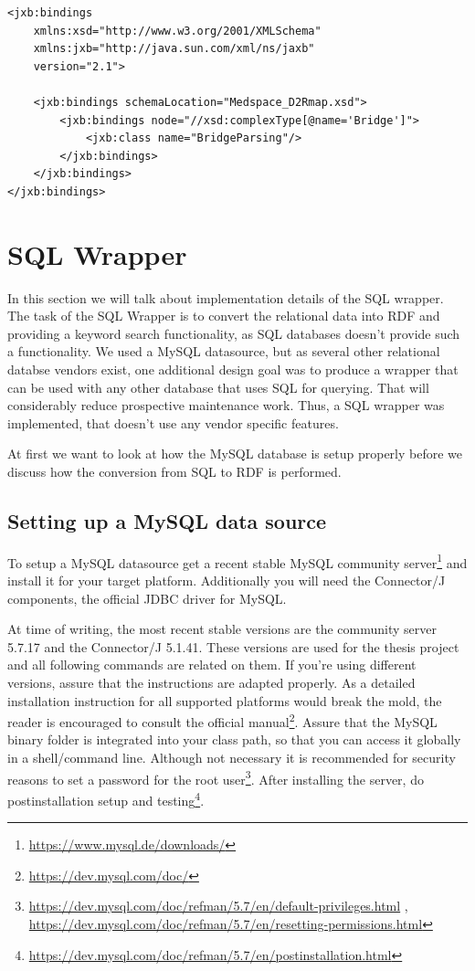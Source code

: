 \begin{lstlisting}[style=RdfCodeStyle, caption=JAXB binding example, label=jaxbExample]
<jxb:bindings 
    xmlns:xsd="http://www.w3.org/2001/XMLSchema"
    xmlns:jxb="http://java.sun.com/xml/ns/jaxb"
    version="2.1">

    <jxb:bindings schemaLocation="Medspace_D2Rmap.xsd">
		<jxb:bindings node="//xsd:complexType[@name='Bridge']">
			<jxb:class name="BridgeParsing"/>
		</jxb:bindings>
    </jxb:bindings>
</jxb:bindings>
\end{lstlisting}



\section{SQL Wrapper}

In this section we will talk about implementation details of the SQL wrapper. 
The task of the SQL Wrapper is to convert the relational data into RDF and providing a keyword search functionality, as SQL databases doesn't provide such a functionality.
We used a MySQL datasource, but as several other relational databse vendors exist, one additional design goal was to produce a wrapper that can be used with any other database that uses SQL for querying. That will considerably reduce prospective maintenance work.
Thus, a SQL wrapper was implemented, that doesn't use any vendor specific features.

At first we want to look at how the MySQL database is setup properly before we discuss how the conversion from SQL to RDF is performed.



\subsection{Setting up a MySQL data source}

To setup a MySQL datasource get a recent stable MySQL community server\footnote{\url{https://www.mysql.de/downloads/}} 
and install it for your target platform. Additionally you will need the Connector/J components, the official JDBC driver for MySQL. 

At time of writing, the most recent stable versions are the community server 5.7.17 and the Connector/J 5.1.41. These versions are used for the thesis project and all following commands are related on them. If you're using 
different versions, assure that the instructions are adapted properly. As a detailed installation instruction for all supported platforms would break the mold, the reader is encouraged to consult the official 
manual\footnote{\url{https://dev.mysql.com/doc/}}. 
Assure that the MySQL binary folder is integrated into your class path, so that you can access it globally in a shell/command line. Although not necessary it is recommended for security reasons 
to set a password for the root user\footnote{\url{https://dev.mysql.com/doc/refman/5.7/en/default-privileges.html} , \url{https://dev.mysql.com/doc/refman/5.7/en/resetting-permissions.html}}. 
After installing the server, do postinstallation setup and testing\footnote{\url{https://dev.mysql.com/doc/refman/5.7/en/postinstallation.html}}. 

